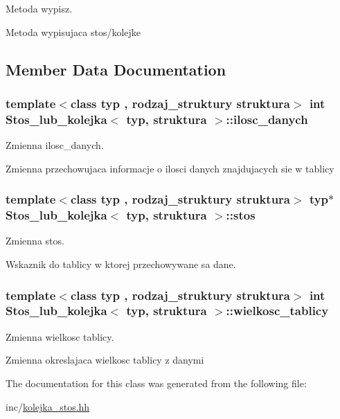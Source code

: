 Metoda wypisz. 

Metoda wypisujaca stos/kolejke 

\subsection{Member Data Documentation}
\hypertarget{class_stos__lub__kolejka_a1a93d8c833d23302598430ddf03a3d06}{
\subsubsection[{ilosc\+\_\+danych}]{\setlength{\rightskip}{0pt plus 5cm}template$<$class typ , rodzaj\+\_\+struktury struktura$>$ int {\bf Stos\+\_\+lub\+\_\+kolejka}$<$ typ, struktura $>$\+::ilosc\+\_\+danych}}\label{class_stos__lub__kolejka_a1a93d8c833d23302598430ddf03a3d06}


Zmienna ilosc\+\_\+danych. 

Zmienna przechowujaca informacje o ilosci danych znajdujacych sie w tablicy \hypertarget{class_stos__lub__kolejka_ad4f12e59b183d738823c43eb99c7bd37}{
\subsubsection[{stos}]{\setlength{\rightskip}{0pt plus 5cm}template$<$class typ , rodzaj\+\_\+struktury struktura$>$ typ$\ast$ {\bf Stos\+\_\+lub\+\_\+kolejka}$<$ typ, struktura $>$\+::stos\hspace{0.3cm}{\ttfamily [private]}}}\label{class_stos__lub__kolejka_ad4f12e59b183d738823c43eb99c7bd37}


Zmienna stos. 

Wskaznik do tablicy w ktorej przechowywane sa dane. \hypertarget{class_stos__lub__kolejka_a73d579d36148bb5047d5d6693aa69b57}{
\subsubsection[{wielkosc\+\_\+tablicy}]{\setlength{\rightskip}{0pt plus 5cm}template$<$class typ , rodzaj\+\_\+struktury struktura$>$ int {\bf Stos\+\_\+lub\+\_\+kolejka}$<$ typ, struktura $>$\+::wielkosc\+\_\+tablicy}}\label{class_stos__lub__kolejka_a73d579d36148bb5047d5d6693aa69b57}


Zmienna wielkosc tablicy. 

Zmienna okreslajaca wielkosc tablicy z danymi 

The documentation for this class was generated from the following file\+:\begin{DoxyCompactItemize}
\item 
inc/\hyperlink{kolejka__stos_8hh}{kolejka\+\_\+stos.\+hh}\end{DoxyCompactItemize}
